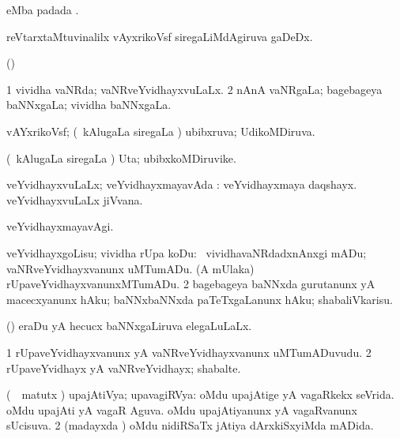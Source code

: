 \bentry
{} 
\gl{\nA}
\expl{}
\bmng
  eMba padada \bava. 
\emng
\eentry

\bentry
{} 
\gl{\nA}
\expl{}
\bmng
 reVtarxtaMtuvinalilx vAyxrikoVsf siregaLiMdAgiruva gaDeDx. 
\emng
\eentry

\bentry
{} 
\gl{\gu}
\expl{}
\bmng
 (\ame)  
\emng
\eentry

\bentry
{} 
\gl{\gu}
\expl{}
\bmng
\bnum
\num{1} vividha vaNRda; vaNRveYvidhayxvuLaLx. 
\num{2} nAnA vaNRgaLa; bagebageya baNNxgaLa; vividha baNNxgaLa. 
\enum
\emng
\eentry

\bentry
{} 
\gl{\gu}
\expl{}
\bmng
 vAYxrikoVsf; (\kanmu\ kAlugaLa siregaLa \vi) ubibxruva; UdikoMDiruva. 
\emng
\eentry

\bentry
{} 
\gl{\nA}
\expl{}
\bmng
 (\kanmu\ kAlugaLa siregaLa \vi) Uta; ubibxkoMDiruvike. 
\emng
\eentry

\bentry
{} 
\gl{\gu}
\expl{}
\bmng
 veYvidhayxvuLaLx; veYvidhayxmayavAda :  veYvidhayxmaya daqshayx.  veYvidhayxvuLaLx jiVvana. 
\emng
\eentry

\bentry
{} 
\gl{\kirxvi}
\expl{}
\bmng
 veYvidhayxmayavAgi. 
\emng
\eentry

\bentry
{} 
\gl{\sakirx}
\expl{}
\bmng
\bnum
{} veYvidhayxgoLisu; vividha rUpa koDu: 
\banum
{} \kanmu\ vividhavaNRdadxnAnxgi mADu; vaNRveYvidhayxvanunx uMTumADu. 
 (A mUlaka) rUpaveYvidhayxvanunxMTumADu. 
\eanum
\numie
\num{2} bagebageya baNNxda gurutanunx yA macecxyanunx hAku; baNNxbaNNxda paTeTxgaLanunx hAku; shabaliVkarisu. 
\enum
\emng
\eentry

\bentry
{} 
\gl{\gu}
\expl{}
\bmng
 (\savi) eraDu yA hecucx baNNxgaLiruva elegaLuLaLx. 
\emng
\eentry

\bentry
{} 
\gl{\nA}
\expl{}
\bmng
\bnum
\num{1} rUpaveYvidhayxvanunx yA vaNRveYvidhayxvanunx uMTumADuvudu. 
\num{2} rUpaveYvidhayx yA vaNRveYvidhayx; shabalte. 
\enum
\emng
\eentry

\bentry
{} 
\gl{\gu}
\expl{}
\bmng
\bnum
{} (\kanmu\ \savi\ matutx \pArxvi) upajAtiVya; upavagiRVya: 
\banum
{} oMdu upajAtige yA vagaRkekx seVrida. 
 oMdu upajAti yA vagaR Aguva. 
 oMdu upajAtiyanunx yA vagaRvanunx sUcisuva. 
\eanum
\numie
\num{2} (madayxda \vi) oMdu nidiRSaTx jAtiya dArxkiSxyiMda mADida. 
\enum
\emng
\eentry

